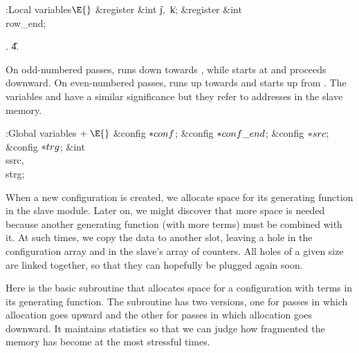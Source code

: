 \B{}:Local variables\X${}\E{}$\6
\&{register} \&{int} \|j${},{}$ \|k;\6
\&{register} \&{int} \\{row\_end};\par
{}.
\U4.\fi

On odd-numbered passes,  runs down towards %
, while 
starts at  and proceeds downward. On even-numbered
passes,
 runs up towards  and  starts
up from .
The variables  and  have a similar significance but
they refer to addresses in the slave memory.

\Y\B\4:Global variables\X${}\mathrel+\E{}$\6
\&{config} ${}{*}\\{conf}{}$;\6
\&{config} ${}{*}\\{conf\_end}{}$;\6
\&{config} ${}{*}\\{src}{}$;\6
\&{config} ${}{*}\\{trg}{}$;\6
\&{int} \\{ssrc}${},{}$ \\{strg};\par
\fi

When a new configuration is created, we allocate space
for its
generating function in the slave module. Later on, we might discover
that more space is needed because another generating function (with
more terms) must be combined with it. At such times, we copy the data to
another slot, leaving a hole in the configuration array and in the slave's
array of counters. All holes of a given size are linked together,
so that they can hopefully be plugged again soon.

Here is the basic subroutine that allocates space for a configuration with
 terms in its generating function. The subroutine has two
versions,
one for passes in which allocation goes upward and the other for
passes in which allocation goes downward. It maintains statistics so
that we can judge how fragmented the memory has become at
the most stressful times.

